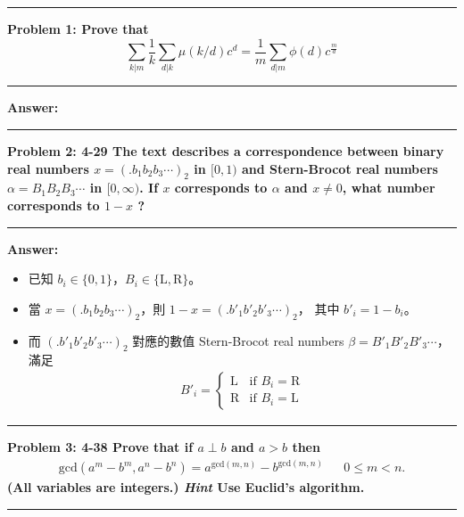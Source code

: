\documentclass[11pt]{article}
\newcommand\question[2]{\vspace{.25in}\hrule\textbf{#1: #2}\vspace{.5em}\hrule\vspace{.10in}}
\renewcommand\part[1]{\vspace{.10in}\textbf{#1}}
\begin{document}
\raggedright
\newcommand\NAME{Shiang-Yun Yang 楊翔雲}  %
\newcommand\ANDREWID{R04922067}     %
\newcommand\HWNUM{4}              %



\question{Problem 1} {Prove that 
	$$\sum_{k|m} \frac{1}{k} \sum_{d|k} \mu(k/d)c^d 
		= \frac{1}{m} \sum_{d|m} \phi(d) c^{\frac{m}{d}}$$
}

\part{Answer:}

\question{Problem 2} {4-29 The text describes a correspondence between
	binary real numbers $x = (.b_1 b_2 b_3 \cdots)_2$ in $[0, 1)$ and 
	Stern-Brocot real numbers $\alpha = B_1 B_2 B_3 \cdots$ in 
	$[0, \infty)$. If $x$ corresponds to $\alpha$ and $x \neq 0$, 
	what number corresponds to $1-x$ ?
}

\part{Answer:}

\begin{itemize}
	\item 已知 $b_i \in \{0, 1\}$，$B_i \in \{\text{L}, \text{R}\}$。
	\item 當 $x = (.b_1 b_2 b_3 \cdots)_2$，則 $1-x = (.b'_1 b'_2 b'_3 \cdots)_2$，
		其中 $b'_i = 1 - b_i$。
	\item 而 $(.b'_1 b'_2 b'_3 \cdots)_2$ 對應的數值 Stern-Brocot real numbers 
		$\beta = B'_1 B'_2 B'_3 \cdots$，滿足
		\begin{align*}
			B'_i = \left\{\begin{matrix}
				\text{L} & \text{if } B_i = \text{R} \\
				\text{R} & \text{if } B_i = \text{L}
			\end{matrix}\right.
		\end{align*}
\end{itemize}

\question{Problem 3} {4-38 Prove that if $a \perp b$ and $a > b$ then
	\begin{align*}	
		\text{gcd}(a^m - b^m, a^n - b^n) = a^{\text{gcd}(m, n)}
			- b^{\text{gcd}(m, n)} && 0 \le m < n.
	\end{align*}
	(All variables are integers.) \textit{Hint} Use Euclid's algorithm.
}
\end{document}
